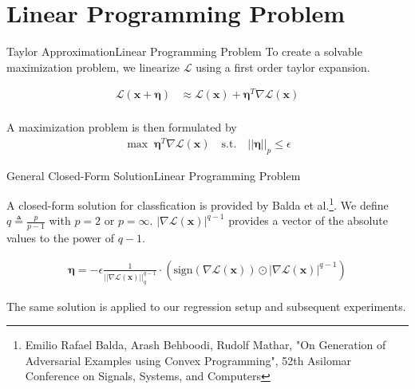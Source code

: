\documentclass[xcolor={cmyk}]{beamer}
\newcommand{\mcl}{\mathcal}
\newcommand{\bm}{\boldsymbol}
\begin{document}
\section{Linear Programming Problem}
\begin{frame}{Taylor Approximation}{Linear Programming Problem}
	To create a solvable maximization problem, we linearize $\mcl{L}$ using a first order taylor expansion.

	\begin{equation*}
	\begin{aligned}
		\mcl{L}(\bm{x} + \bm{\eta}) &\approx \mcl{L}(\bm{x}) + \bm{\eta}^T \nabla \mcl{L}(\bm{x})
	\end{aligned}
	\end{equation*}\\[10pt]

	A maximization problem is then formulated by\\[10pt]

	\begin{equation*}
	\begin{aligned}
		\max \; \bm{\eta}^T \nabla \mcl{L}(\bm{x}) \quad \text{s.t.} \quad \lvert\lvert \bm{\eta} \rvert\rvert_p \leq \epsilon
	\end{aligned}
	\end{equation*}

\end{frame}

\begin{frame}{General Closed-Form Solution}{Linear Programming Problem}

	A closed-form solution for classfication is provided by Balda et al.\footnote{Emilio Rafael Balda, Arash Behboodi, Rudolf Mathar, "On Generation of Adversarial Examples using Convex Programming", 52th Asilomar Conference on Signals, Systems, and Computers}.
	We define $q \triangleq \frac{p}{p-1}$ with $p=2$ or $p=\infty$. $\lvert \nabla \mcl{L}(\bm{x}) \rvert^{q-1}$ provides a vector of the absolute values to the power of $q - 1$.

	\begin{equation*}
	\begin{aligned}
		\bm{\eta} = - \epsilon \frac{1}{\lvert\lvert \nabla \mcl{L}(\bm{x}) \rvert\rvert_q^{q-1}} \cdot ( \text{sign}( \nabla \mcl{L}(\bm{x}) ) \odot \lvert \nabla \mcl{L}(\bm{x}) \rvert^{q-1} )
	\end{aligned}
	\label{linear_programming_solution}
	\end{equation*}

	The same solution is applied to our regression setup and subsequent experiments.

\end{frame}
\end{document}
